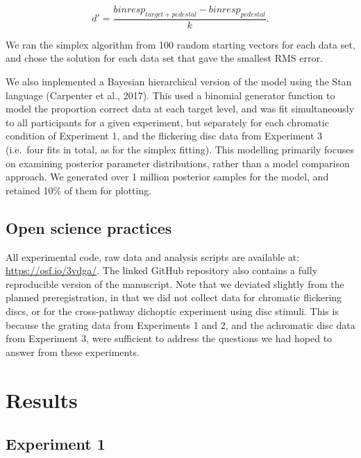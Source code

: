 \documentclass[
]{article}
\begin{document}
\begin{equation}
d' = \frac{binresp_{target+pedestal} - binresp_{pedestal}}{k}.
\end{equation}

We ran the simplex algorithm from 100 random starting vectors for each data set, and chose the solution for each data set that gave the smallest RMS error.

We also implemented a Bayesian hierarchical version of the model using the Stan language (Carpenter et al., 2017). This used a binomial generator function to model the proportion correct data at each target level, and was fit simultaneously to all participants for a given experiment, but separately for each chromatic condition of Experiment 1, and the flickering disc data from Experiment 3 (i.e.~four fits in total, as for the simplex fitting). This modelling primarily focuses on examining posterior parameter distributions, rather than a model comparison approach. We generated over 1 million posterior samples for the model, and retained 10\% of them for plotting.

\hypertarget{open-science-practices}{%
\subsection{Open science practices}\label{open-science-practices}}

All experimental code, raw data and analysis scripts are available at: \url{https://osf.io/3vdga/}. The linked GitHub repository also contains a fully reproducible version of the manuscript. Note that we deviated slightly from the planned preregistration, in that we did not collect data for chromatic flickering discs, or for the cross-pathway dichoptic experiment using disc stimuli. This is because the grating data from Experiments 1 and 2, and the achromatic disc data from Experiment 3, were sufficient to address the questions we had hoped to answer from these experiments.

\hypertarget{results}{%
\section{Results}\label{results}}

\hypertarget{experiment-1}{%
\subsection{Experiment 1}\label{experiment-1}}
\end{document}

